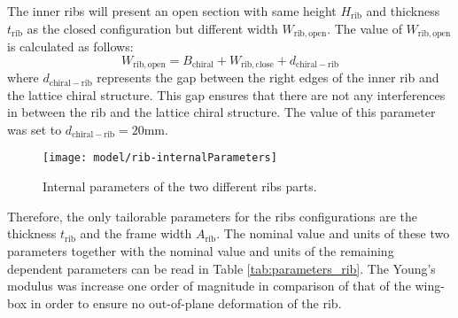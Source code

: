 The inner ribs will present an open section with same height $H_{\mathrm{rib}}$ and thickness $t_{\mathrm{rib}}$ as the closed configuration but different width $W_{\mathrm{rib,open}}$. The value of $W_{\mathrm{rib,open}}$ is calculated as follows:
$$
W_{\mathrm{rib,open}} = B_{\mathrm{chiral}} + W_{\mathrm{rib,close}} + d_{\mathrm{chiral-rib}}
$$
where $d_{\mathrm{chiral-rib}}$ represents the gap between the right edges of the inner rib and the lattice chiral structure. This gap ensures that there are not any interferences in between the rib and the lattice chiral structure. The value of this parameter was set to $d_{\mathrm{chiral-rib}} = 20$mm.

\begin{figure}[!htpb]
  \centering
  \texttt{[image: model/rib-internalParameters]}
  \caption[Internal parameters of the two different ribs parts]{Internal parameters of the two different ribs parts.}\label{fig:rib-internalParameters}
\end{figure}

Therefore, the only tailorable parameters for the ribs configurations are the thickness $t_{\mathrm{rib}}$ and the frame width $A_{\mathrm{rib}}$. The nominal value and units of these two parameters together with the nominal value and units of the remaining dependent parameters can be read in Table \ref{tab:parameters_rib}. The Young's modulus was increase one order of magnitude in comparison of that of the wing-box in order to ensure no out-of-plane deformation of the rib.

